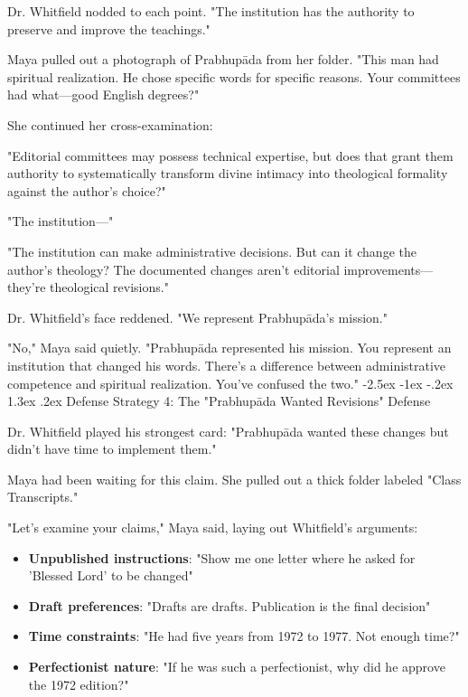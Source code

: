 \documentclass[12pt,twoside]{book}
\makeatletter
\renewcommand\section{\@startsection{section}{1}{\z@}%
{-2.5ex \@plus -1ex \@minus -.2ex}%
{1.3ex \@plus.2ex}%
{\normalfont\Large\bfseries}}
\makeatother
\begin{document}
Dr. Whitfield nodded to each point. "The institution has the authority to preserve and improve the teachings."

Maya pulled out a photograph of Prabhupāda from her folder. "This man had spiritual realization. He chose specific words for specific reasons. Your committees had what—good English degrees?"

She continued her cross-examination:

"Editorial committees may possess technical expertise, but does that grant them authority to systematically transform divine intimacy into theological formality against the author's choice?"

"The institution—"

"The institution can make administrative decisions. But can it change the author's theology? The documented changes aren't editorial improvements—they're theological revisions."

Dr. Whitfield's face reddened. "We represent Prabhupāda's mission."

"No," Maya said quietly. "Prabhupāda represented his mission. You represent an institution that changed his words. There's a difference between administrative competence and spiritual realization. You've confused the two."
\section{Defense Strategy 4: The "Prabhupāda Wanted Revisions" Defense}
\label{sec:orgaf96508}

Dr. Whitfield played his strongest card: "Prabhupāda wanted these changes but didn't have time to implement them."

Maya had been waiting for this claim. She pulled out a thick folder labeled "Class Transcripts."

"Let's examine your claims," Maya said, laying out Whitfield's arguments:

\begin{itemize}
\item \textbf{\textbf{Unpublished instructions}}: "Show me one letter where he asked for 'Blessed Lord' to be changed"
\item \textbf{\textbf{Draft preferences}}: "Drafts are drafts. Publication is the final decision"
\item \textbf{\textbf{Time constraints}}: "He had five years from 1972 to 1977. Not enough time?"
\item \textbf{\textbf{Perfectionist nature}}: "If he was such a perfectionist, why did he approve the 1972 edition?"
\end{itemize}
\end{document}
